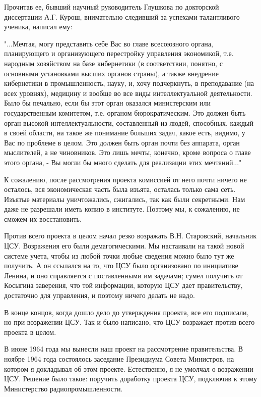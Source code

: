 \documentclass{article}
\begin{document}
Прочитав ее, бывший научный руководитель Глушкова по докторской диссертации А.Г.
Курош, внимательно следивший за успехами талантливого ученика, написал ему:

"...Мечтая, могу представить себе Вас во главе всесоюзного органа, планирующего
и организующего перестройку управления экономикой, т.е. народным хозяйством на
базе кибернетики (в соответствии, понятно, с основными установками высших
органов страны), а также внедрение кибернетики в промышленность, науку, и, хочу
подчеркнуть, в преподавание (на всех уровнях), медицину и вообще во все виды
интеллектуальной деятельности. Было бы печально, если бы этот орган оказался
министерским или государственным комитетом, т.е. органом бюрократическим. Это
должен быть орган высокой интеллектуальности, составленный из людей, способных,
каждый в своей области, на такое же понимание больших задач, какое есть, видимо,
у Вас по проблеме в целом. Это должен быть орган почти без аппарата, орган
мыслителей, а не чиновников. Это лишь мечты, конечно, кроме вопроса о главе
этого органа, - Вы могли бы много сделать для реализации этих мечтаний..."

К сожалению, после рассмотрения проекта комиссией от него почти ничего не
осталось, вся экономическая часть была изъята, осталась только сама сеть.
Изъятые материалы уничтожались, сжигались, так как были секретными. Нам даже не
разрешали иметь копию в институте. Поэтому мы, к сожалению, не сможем их
восстановить.

Против всего проекта в целом начал резко возражать В.Н. Старовский, начальник
ЦСУ. Возражения его были демагогическими. Мы настаивали на такой новой системе
учета, чтобы из любой точки любые сведения можно было тут же получить. А он
ссылался на то, что ЦСУ было организовано по инициативе Ленина, и оно
справляется с поставленными им задачами; сумел получить от Косыгина заверения,
что той информации, которую ЦСУ дает правительству, достаточно для управления, и
поэтому ничего делать не надо.

В конце концов, когда дошло дело до утверждения проекта, все его подписали, но
при возражении ЦСУ. Так и было написано, что ЦСУ возражает против всего проекта
в целом.

В июне 1964 года мы вынесли наш проект на рассмотрение правительства. В ноябре
1964 года состоялось заседание Президиума Совета Министров, на котором я
докладывал об этом проекте. Естественно, я не умолчал о возражении ЦСУ. Решение
было такое: поручить доработку проекта ЦСУ, подключив к этому Министерство
радиопромышленности.
\end{document}
